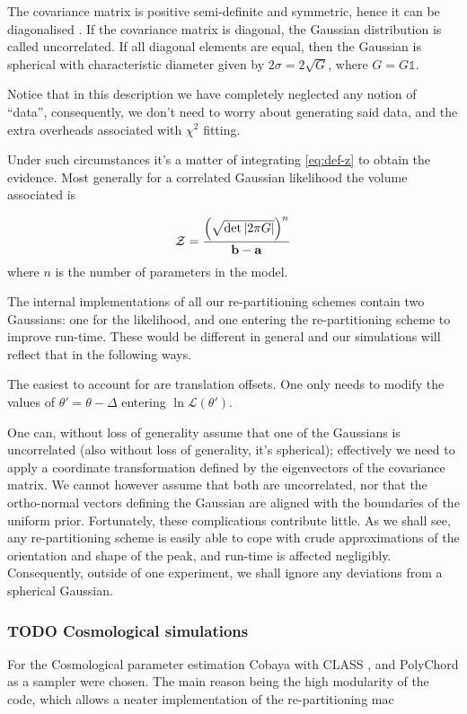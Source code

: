 \documentclass[usenatbib]{mnras}
\begin{document}
The covariance matrix is positive semi-definite and symmetric,
hence it can be diagonalised \citep{taboga2017lectures}. If the
covariance matrix is diagonal, the Gaussian distribution is called
uncorrelated. If all diagonal elements are equal, then the
Gaussian is spherical with characteristic diameter given by \(2
	\sigma = 2\sqrt{G}\), where \(G = G \mathds{1}\).

Notice that in this description we have completely neglected any
notion of ``data'', consequently, we don't need to worry about
generating said data, and the extra overheads associated with
\(\chi^2\) fitting.

Under such circumstances it's a matter of integrating \ref{eq:def-z}
to obtain the evidence. Most generally for a correlated Gaussian
likelihood the volume associated is 

\begin{equation}\label{eq:evidence}
   {\cal Z} = \frac{\left( \sqrt{ \det \left| 2\pi G \right|} \right)^{n}}{\mathbf{b}-\mathbf{a}}  
\end{equation}
where \(n\) is the number of parameters in the model.

The internal implementations of all our re-partitioning schemes
contain two Gaussians: one for the likelihood, and one
entering the re-partitioning scheme to improve run-time. These
would be different in general and our simulations will reflect
that in the following ways.

The easiest to account for are translation offsets. One only needs to
modify the values of \(\theta' = \theta - \Delta\) entering \(\ln
	\mathcal{L}(\theta')\). 

One can, without loss of generality assume that one of the
Gaussians is uncorrelated (also without loss of generality, it's
spherical); effectively we need to apply a coordinate
transformation defined by the eigenvectors of the covariance
matrix. We cannot however assume that both are uncorrelated, nor
that the ortho-normal vectors defining the Gaussian are aligned
with the boundaries of the uniform prior. Fortunately, these
complications contribute little. As we shall see, any
re-partitioning scheme is easily able to cope with crude
approximations of the orientation and shape of the peak, and
run-time is affected negligibly. Consequently, outside of one
experiment, we shall ignore any deviations from a spherical
Gaussian.





\subsubsection{{\bfseries\sffamily TODO} Cosmological simulations}
\label{sec:orgc9ea453}
For the Cosmological parameter estimation Cobaya \citep{cobaya} with
CLASS \citep{Blas_2011}, and PolyChord \citep{polychord} as a sampler
were chosen. The main reason being the high modularity of the code,
which allows a neater implementation of the re-partitioning
mac
\end{document}
